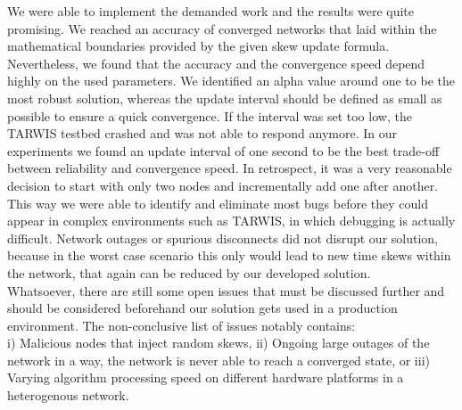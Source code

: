 \documentclass{llncs}
\begin{document}
We were able to implement the demanded work and the results were quite promising. We reached an accuracy of converged networks that laid within the mathematical boundaries provided by the given skew update formula. Nevertheless, we found that the accuracy and the convergence speed depend highly on the used parameters. We identified an alpha value around one to be the most robust solution, whereas the update interval should be defined as small as possible to ensure a quick convergence. If the interval was set too low, the TARWIS testbed crashed and was not able to respond anymore. In our experiments we found an update interval of one second to be the best trade-off between reliability and convergence speed. In retrospect, it was a very reasonable decision to start with only two nodes and incrementally add one after another. This way we were able to identify and eliminate most bugs before they could appear in complex environments such as TARWIS, in which debugging is actually difficult. Network outages or spurious disconnects did not disrupt our solution, because in the worst case scenario this only would lead to new time skews within the network, that again can be reduced by our developed solution.\\ Whatsoever, there are still some open issues that must be discussed further and should be considered beforehand our solution gets used in a production environment. The non-conclusive list of issues notably contains:\\
i) Malicious nodes that inject random skews, ii) Ongoing large outages of the network in a way, the network is never able to reach a converged state, or iii) Varying algorithm processing speed on different hardware platforms in a heterogenous network.

{}



%
%
\end{document}
